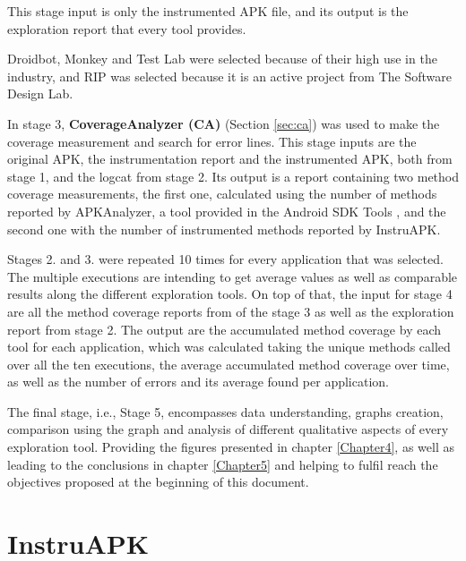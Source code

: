 This stage input is only the instrumented APK file, and its output is the exploration report that every tool provides. 
 

Droidbot, Monkey and Test Lab were selected because of their high use in the industry, and RIP was selected because it is an active project from The Software Design Lab. 

In stage 3, \textbf{CoverageAnalyzer (CA)} (Section \ref{sec:ca}) was used to make the coverage measurement and search for error lines. This stage inputs are the original APK, the instrumentation report and the instrumented APK, both from stage 1, and the logcat from stage 2. Its output is a report containing two method coverage measurements, the first one, calculated using the number of methods reported by APKAnalyzer, a tool provided in the Android SDK Tools , and the second one with the number of instrumented methods reported by InstruAPK.


Stages 2. and 3. were repeated 10 times for every application that was selected. The multiple executions are intending to get average values as well as comparable results along the different exploration tools. On top of that, the input for stage 4 are all the method coverage reports from of the stage 3 as well as the exploration report from stage 2. The output are the accumulated method coverage by each tool for each application, which was calculated taking the unique methods called over all the ten executions, the average accumulated method coverage over time, as well as the number of errors and its average found per application.

The final stage, i.e.,  Stage 5,  encompasses data understanding, graphs creation, comparison using the graph and analysis of different qualitative aspects of every exploration tool. Providing the figures presented in chapter \ref{Chapter4}, as well as leading to the conclusions in chapter \ref{Chapter5} and helping to fulfil reach the objectives proposed at the beginning of this document.



\section{InstruAPK}\label{sec:instruAPK}

